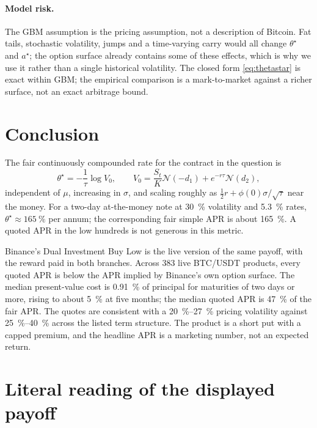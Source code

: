 \documentclass[11pt]{article}
\newcommand{\N}{\mathcal{N}}
\begin{document}
\paragraph{Model risk.} The GBM assumption is the pricing assumption, not a description of Bitcoin. Fat tails, stochastic volatility, jumps and a time-varying carry would all change $\theta^\star$ and $a^\star$; the option surface already contains some of these effects, which is why we use it rather than a single historical volatility. The closed form \eqref{eq:thetastar} is exact within GBM; the empirical comparison is a mark-to-market against a richer surface, not an exact arbitrage bound.

\section{Conclusion}

The fair continuously compounded rate for the contract in the question is
\[
\theta^\star=-\frac{1}{\tau}\log V_0,
\qquad
V_0=\frac{S_t}{K}\N(-d_1)+e^{-r\tau}\N(d_2),
\]
independent of $\mu$, increasing in $\sigma$, and scaling roughly as $\tfrac12 r+\phi(0)\sigma/\sqrt{\tau}$ near the money. For a two-day at-the-money note at \SI{30}{\percent} volatility and \SI{5.3}{\percent} rates, $\theta^\star\approx\SI{165}{\percent}$ per annum; the corresponding fair simple APR is about \SI{165}{\percent}. A quoted APR in the low hundreds is not generous in this metric.

Binance's Dual Investment Buy Low is the live version of the same payoff, with the reward paid in both branches. Across 383 live BTC/USDT products, every quoted APR is below the APR implied by Binance's own option surface. The median present-value cost is \SI{0.91}{\percent} of principal for maturities of two days or more, rising to about \SI{5}{\percent} at five months; the median quoted APR is \SI{47}{\percent} of the fair APR. The quotes are consistent with a \SI{20}{\percent}--\SI{27}{\percent} pricing volatility against \SI{25}{\percent}--\SI{40}{\percent} across the listed term structure. The product is a short put with a capped premium, and the headline APR is a marketing number, not an expected return.

\appendix

\section{Literal reading of the displayed payoff}\label{app:literal}
\end{document}
